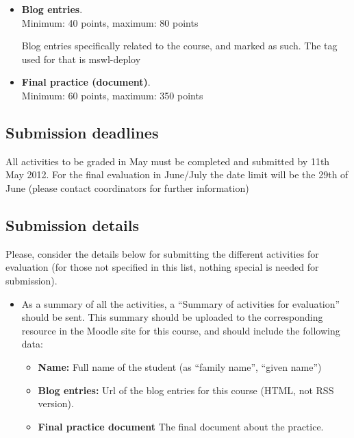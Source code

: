 \documentclass[a4paper]{article}
\begin{document}
\begin{itemize}
\item \textbf{Blog entries}. \\
  Minimum: 40 points, maximum: 80 points

  Blog entries specifically related to the course, and marked as such. The tag used for that is mswl-deploy


\item \textbf{Final practice (document)}. \\
  Minimum: 60 points, maximum: 350 points



\end{itemize}

\subsection{Submission deadlines}

All activities to be graded in May must be completed and submitted by 11th May 2012. For the final evaluation in June/July the date limit will be the 29th of June (please contact coordinators for further information)

\subsection{Submission details}

Please, consider the details below for submitting the different activities for evaluation (for those not specified in this list, nothing special is needed for submission).

\begin{itemize}
\item As a summary of all the activities, a ``Summary of activities for evaluation'' should be sent. This summary should be uploaded to the corresponding resource in the Moodle site for this course, and should include the following data:
  \begin{itemize}
  \item \textbf{Name:} Full name of the student (as ``family name'', ``given name'')
  \item \textbf{Blog entries:} Url of the blog entries for this course (HTML, not RSS version).
  \item \textbf{Final practice document} The final document about the practice.  
  \end{itemize}
\end{itemize}
\end{document}
